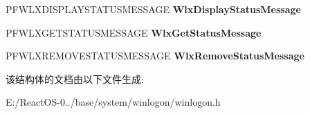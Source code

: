 \begin{DoxyCompactItemize}
P\+F\+W\+L\+X\+D\+I\+S\+P\+L\+A\+Y\+S\+T\+A\+T\+U\+S\+M\+E\+S\+S\+A\+GE {\bfseries Wlx\+Display\+Status\+Message}
\item 
\mbox{\label{struct___g_i_n_a_f_u_n_c_t_i_o_n_s_ab51c3557cb0e53d4d704b842f6e81024}} 
P\+F\+W\+L\+X\+G\+E\+T\+S\+T\+A\+T\+U\+S\+M\+E\+S\+S\+A\+GE {\bfseries Wlx\+Get\+Status\+Message}
\item 
\mbox{\label{struct___g_i_n_a_f_u_n_c_t_i_o_n_s_af14f4b4430fdd90b7febe0aae62d439c}} 
P\+F\+W\+L\+X\+R\+E\+M\+O\+V\+E\+S\+T\+A\+T\+U\+S\+M\+E\+S\+S\+A\+GE {\bfseries Wlx\+Remove\+Status\+Message}
\end{DoxyCompactItemize}


该结构体的文档由以下文件生成\+:\begin{DoxyCompactItemize}
\item 
E\+:/\+React\+O\+S-\/0../base/system/winlogon/winlogon.\+h\end{DoxyCompactItemize}
